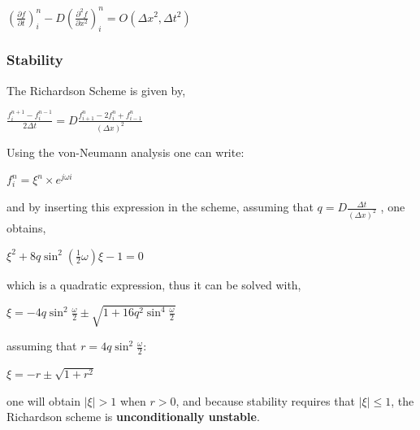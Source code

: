 \documentclass[12pt]{article}
\begin{document}
\begin{center}
\Large
$
\left( \frac{\partial f}{\partial t} \right)_i^n - D \left( \frac{\partial ^2 f}{\partial x ^2} \right)_i^n = O(\Delta x ^2, \Delta t ^2)
$
\end{center}
\subsubsection*{Stability}

\par The Richardson Scheme is given by,

\begin{center}
\Large
$
\frac{f_i^{n + 1} - f_i^{n - 1}}{2 \Delta t} = D \frac{f_{i + 1}^{n} - 2f_{i}^{n} + f_{i - 1}^{n}}{(\Delta x)^2}
$
\end{center}

\par Using the von-Neumann analysis one can write:

\begin{center}
\large
$ 
f_i^{n} = \xi^n \times e^{j \omega i}
$
\end{center}

\par and by inserting this expression in the scheme, assuming that $ q = D \frac{\Delta t}{(\Delta x)^2}$ , one obtains, 

\begin{center}
\large
$ 
	\xi ^2 + 8 q \sin ^2( \frac{1}{2} \omega) \xi - 1 = 0
$
\end{center}

which is a quadratic expression, thus it can be solved with,

\begin{center}
\large
$ 
	\xi = -4 q \sin ^2 \frac{\omega}{2} \pm \sqrt{1 + 16 q ^2 \sin ^4 \frac{\omega}{2}}
$
\end{center}

assuming that $r = 4 q \sin ^2 \frac{\omega}{2} $:

\begin{center}
\large
$ 
	\xi = -r \pm \sqrt{1 + r ^2}
$
\end{center}

one will obtain $\lvert \xi \lvert > 1$  when $r > 0$, and because stability requires that $\lvert \xi \lvert \le 1 $, the Richardson scheme is \textbf{unconditionally unstable}.

\newpage
\end{document}
